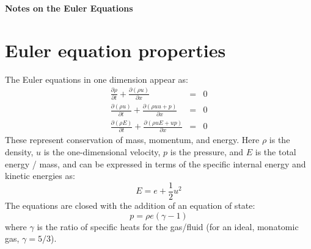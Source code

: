 \documentclass[11pt]{article}
\begin{document}
\begin{center}
{\LARGE \textsf{\textbf{
Notes on the Euler Equations}}
}
\end{center}

\begin{quote}
\end{quote}

\section{Euler equation properties}

The Euler equations in one dimension appear as:
\begin{eqnarray}
\frac{\partial \rho}{\partial t} + 
    \frac{\partial (\rho u)}{\partial x} &=& 0 \\
%
\frac{\partial(\rho u)}{\partial t} +
    \frac{\partial (\rho uu + p)}{\partial x} &=& 0 \\
%
\frac{\partial(\rho E)}{\partial t} + 
    \frac{\partial(\rho u E + u p)}{\partial x} &=& 0
\end{eqnarray}
These represent conservation of mass, momentum, and energy.  Here $\rho$ is the
density, $u$ is the one-dimensional velocity, $p$ is the pressure, and $E$
is the total energy / mass, and can be expressed in terms of the
specific internal energy and kinetic energies as:
\begin{equation}
E = e + \frac{1}{2} u^2
\end{equation}
The equations are closed with the addition of an equation of state:
\begin{equation}
p = \rho e(\gamma - 1)
\end{equation}
where $\gamma$ is the ratio of specific heats for the gas/fluid (for
an ideal, monatomic gas, $\gamma = 5/3$).
\end{document}
